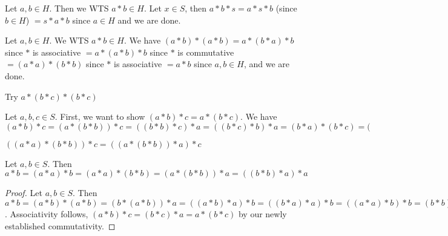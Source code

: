 Let $a,b\in H$. Then we WTS  $a*b\in H$. Let  $x\in S$, then $a*b*s=a*s*b$ (since $b\in H$) $=s*a*b$ since $a\in H$ and we are done.

Let $a,b\in H$. We WTS $a*b\in H$. We have $(a*b)*(a*b)=a*(b*a)*b$ since $*$ is associative  $=a*(a*b)*b$ since $*$ is commutative $=(a*a)*(b*b)$ since $*$ is associative $=a*b$ since $a,b \in H$, and we are done.

Try $a*(b*c)*(b*c)$

Let $a,b,c\in S$. First, we want to show $(a*b)*c=a*(b*c)$. We have $(a*b)*c=(a*(b*b))*c=((b*b)*c)*a=((b*c)*b)*a=(b*a)*(b*c)=($

$((a*a)*(b*b))*c=((a*(b*b))*a)*c$

Let $a,b\in S$. Then $a*b=(a*a)*b=(a*a)*(b*b)=(a*(b*b))*a=((b*b)*a)*a$
\begin{proof}
Let $a,b\in S$. Then $a*b=(a*b)*(a*b)=(b*(a*b))*a=((a*b)*a)*b=((b*a)*a)*b=((a*a)*b)*b=(b*b)*(a*a)=b*a$. Associativity follows, $(a*b)*c=(b*c)*a=a*(b*c)$ by our newly established commutativity.
\end{proof}

